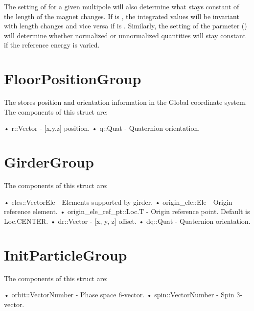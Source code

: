 The setting of  for a given multipole will also determine what stays constant
of the length of the magnet changes. If  is , the integrated values
will be invariant with length changes and vice versa if  is . 
Similarly, the setting of the  parmeter () will determine 
whether normalized or unnormalized quantities will stay constant if the reference energy is varied.

\section{FloorPositionGroup}
\label{s:floor.pos.g}

The  stores position and orientation information in the Global coordinate 
system. The components of this struct are:
\begin{example}
• r::Vector              - [x,y,z] position. 
• q::Quat                - Quaternion orientation. 
\end{example}

\section{GirderGroup}
\label{s:girder.g}

The components of this struct are:
\begin{example}
• eles::Vector{Ele}         - Elements supported by girder. 
• origin_ele::Ele           - Origin reference element. 
• origin_ele_ref_pt::Loc.T  - Origin reference point. Default is Loc.CENTER. 
• dr::Vector                - [x, y, z] offset. 
• dq::Quat                   - Quaternion orientation. 
\end{example}


\section{InitParticleGroup}
\label{s:init.particle.g}

The components of this struct are:
\begin{example}
• orbit::Vector{Number}     - Phase space 6-vector. 
• spin::Vector{Number}      - Spin 3-vector. \end{example}

